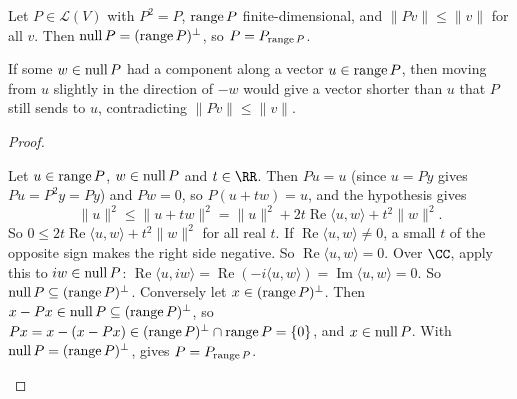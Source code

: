 \documentclass[10pt]{scrartcl}
\newcommand{\ip}[2]{\langle #1,#2\rangle}
\newcommand{\LL}{\mathcal L}\newcommand{\PP}{\mathcal P}\newcommand{\MM}{\mathcal M}
\begin{document}
\begin{proposition*}
  Let $P\in\LL(V)$ with $P^2=P$, $\operatorname{range} P$ finite-dimensional, and $\|Pv\|\le\|v\|$ for all $v$. Then $\operatorname{null} P=(\operatorname{range} P)^\perp$, so $P=P_{\operatorname{range} P}$.
\end{proposition*}
\begin{ideabox}
If some $w\in\operatorname{null} P$ had a component along a vector $u\in\operatorname{range} P$, then moving from $u$ slightly in the direction of $-w$ would give a vector shorter than $u$ that $P$ still sends to $u$, contradicting $\|Pv\|\le\|v\|$.
\end{ideabox}
\begin{proof}
  \begin{steps}
    \ii Let $u\in\operatorname{range} P$, $w\in\operatorname{null} P$ and $t\in\RR$. Then $Pu=u$ (since $u=Py$ gives $Pu=P^2y=Py$) and $Pw=0$, so $P(u+tw)=u$, and the hypothesis gives
    \[ \|u\|^2\le\|u+tw\|^2=\|u\|^2+2t\operatorname{Re}\ip uw+t^2\|w\|^2. \]
    \ii So $0\le2t\operatorname{Re}\ip uw+t^2\|w\|^2$ for all real $t$. If $\operatorname{Re}\ip uw\ne0$, a small $t$ of the opposite sign makes the right side negative. So $\operatorname{Re}\ip uw=0$. Over $\CC$, apply this to $iw\in\operatorname{null} P$: $\operatorname{Re}\ip u{iw}=\operatorname{Re}(-i\ip uw)=\operatorname{Im}\ip uw=0$. So $\operatorname{null} P\subseteq(\operatorname{range} P)^\perp$.
    \ii Conversely let $x\in(\operatorname{range} P)^\perp$. Then $x-Px\in\operatorname{null} P\subseteq(\operatorname{range} P)^\perp$, so $Px=x-(x-Px)\in(\operatorname{range} P)^\perp\cap\operatorname{range} P=\{0\}$, and $x\in\operatorname{null} P$.
    \ii With $\operatorname{null} P=(\operatorname{range} P)^\perp$,  gives $P=P_{\operatorname{range} P}$.
  \end{steps}
\end{proof}
\end{document}
